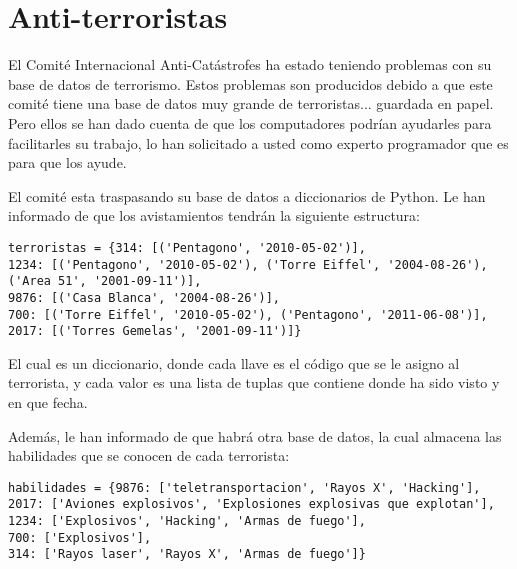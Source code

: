 \section{Anti-terroristas}

El Comité Internacional Anti-Catástrofes ha estado teniendo problemas con su base de datos de terrorismo. Estos problemas son producidos debido a que este comité tiene una base de datos muy grande de terroristas... guardada en papel. Pero ellos se han dado cuenta de que los computadores podrían ayudarles para facilitarles su trabajo, lo han solicitado a usted como experto programador que es para que los ayude.

El comité esta traspasando su base de datos a diccionarios de Python. Le han informado de que los avistamientos tendrán la siguiente estructura:

\begin{lstlisting}[style=consola]
terroristas = {314: [('Pentagono', '2010-05-02')],
1234: [('Pentagono', '2010-05-02'), ('Torre Eiffel', '2004-08-26'), 
('Area 51', '2001-09-11')], 
9876: [('Casa Blanca', '2004-08-26')],
700: [('Torre Eiffel', '2010-05-02'), ('Pentagono', '2011-06-08')], 
2017: [('Torres Gemelas', '2001-09-11')]}
\end{lstlisting}

El cual es un diccionario, donde cada llave es el código que se le asigno al terrorista, y cada valor es una lista de tuplas que contiene donde ha sido visto y en que fecha.

Además, le han informado de que habrá otra base de datos, la cual almacena las habilidades que se conocen de cada terrorista:

\begin{lstlisting}[style=consola]
habilidades = {9876: ['teletransportacion', 'Rayos X', 'Hacking'],
2017: ['Aviones explosivos', 'Explosiones explosivas que explotan'], 
1234: ['Explosivos', 'Hacking', 'Armas de fuego'], 
700: ['Explosivos'], 
314: ['Rayos laser', 'Rayos X', 'Armas de fuego']}
\end{lstlisting}

